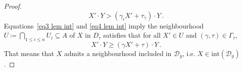 \documentclass[10pt,a4paper]{amsart}
\newcommand{\DL}{\mathcal{D}} %
\begin{document}
\begin{proof}
\begin{equation}
\label{eq4 lem int}
X' \cdot Y >(\gamma_i X' + \tau_\gamma) \cdot Y \, . 
\end{equation}
Equations~\eqref{eq3 lem int} and \eqref{eq4 lem int} imply the neighbourhood $U \coloneqq \bigcap_{1 \leq i \leq n} U_i \subseteq A$ of $X$ in $D_\tau$ satisfies that for all $X' \in U$ and $(\gamma,\tau) \in \Gamma_\tau$, 
\begin{equation*}
 X' \cdot Y \geq (\gamma X' + \tau ) \cdot Y \, . 
\end{equation*}
That means that $X$ admits a neighbourhood included in $\DL_{y}$, i.e. $X \in \mathrm{int}(\DL_{y})$. 
\end{proof}
\end{document}
